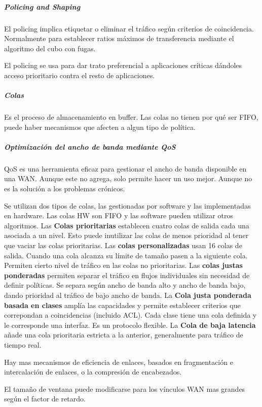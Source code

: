             \subparagraph{Policing and Shaping} %
                El policing implica etiquetar o eliminar el tráfico según criterios de coincidencia. Normalmente para establecer ratios máximos de transferencia mediante el algoritmo del cubo con fugas.

                El policing se usa para dar trato preferencial a aplicaciones críticas dándoles acceso prioritario contra el resto de aplicaciones.

            \subparagraph{Colas} %
                Es el proceso de almacenamiento en buffer. Las colas no tienen por qué ser FIFO, puede haber mecanismos que afecten a algun tipo de política.

            \subparagraph{Optimización del ancho de banda mediante QoS} %
                QoS es una herramienta eficaz para gestionar el ancho de banda disponible en una WAN. Aunque este no agrega, solo permite hacer un uso mejor. Aunque no es la solución a los problemas crónicos.

                Se utilizan dos tipos de colas, las gestionadas por software y las implementadas en hardware. Las colas HW son FIFO y las software pueden utilizar otros algoritmos. Las \textbf{Colas prioritarias} establecen cuatro colas de salida cada una asociada a un nivel. Esto puede inutilizar las colas de menos prioridad al tener que vaciar las colas prioritarias. Las \textbf{colas personalizadas} usan 16 colas de salida. Cuando una cola alcanza su límite de tamaño pasen a la siguiente cola. Permiten cierto nivel de tráfico en las colas no prioritarias. Las \textbf{colas justas ponderadas} permiten separar el tráfico en flujos individuales sin necesidad de definir políticas. Se separa según ancho de banda alto y ancho de banda bajo, dando prioridad al tráfico de bajo ancho de banda. La \textbf{Cola justa ponderada basada en clases} amplía las capacidades y permite establecer criterios que correpondan a coincidencias (incluido ACL). Cada clase tiene una cola definida y le corresponde una interfaz. Es un protocolo flexible. La \textbf{Cola de baja latencia} añade una cola prioritaria estricta a la anterior, generalmente para tráfico de tiempo real.

                Hay mas mecanismos de eficiencia de enlaces, basados en fragmentación e intercalación de enlaces, o la compresión de encabezados.

                El tamaño de ventana puede modificarse para los vínculos WAN mas grandes según el factor de retardo.

